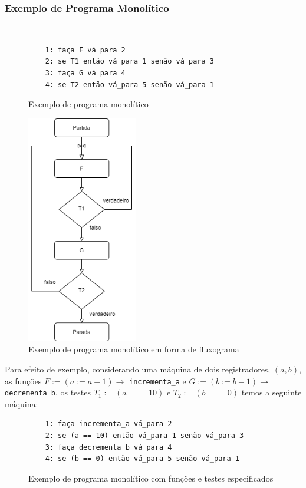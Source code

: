 \documentclass[12pt,fleqn]{article}
\begin{document}
\subsubsection{Exemplo de Programa Monolítico}
~ %

\begin{figure}[H]
\begin{verbatim}
    1: faça F vá_para 2
    2: se T1 então vá_para 1 senão vá_para 3
    3: faça G vá_para 4
    4: se T2 então vá_para 5 senão vá_para 1
\end{verbatim}
\caption{Exemplo de programa monolítico}
\end{figure}

\begin{figure}[H]
    \centering
    \includegraphics[height=10cm]{img/monolitico_ex}
    \caption{Exemplo de programa monolítico em forma de fluxograma}
\end{figure}

Para efeito de exemplo, considerando uma máquina de dois registradores, $(a,b)$,
as funções $F := (a := a+1) \rightarrow$ \verb|incrementa_a| e $G := (b := b-1)
\rightarrow$ \verb|decrementa_b|, os testes $T_1 := (a == 10)$ e $T_2 := (b ==
0)$ temos a seguinte máquina:

\begin{figure}[H]
\begin{verbatim}
    1: faça incrementa_a vá_para 2
    2: se (a == 10) então vá_para 1 senão vá_para 3
    3: faça decrementa_b vá_para 4
    4: se (b == 0) então vá_para 5 senão vá_para 1
\end{verbatim}
\caption{Exemplo de programa monolítico com funções e testes especificados}
\end{figure}
\end{document}
